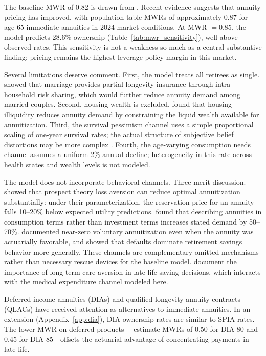 \documentclass[12pt]{article}
\begin{document}
The baseline MWR of 0.82 is drawn from \citet{mitchell1999}. Recent evidence suggests that annuity pricing has improved, with population-table MWRs of approximately 0.87 for age-65 immediate annuities in 2024 market conditions. At MWR $= 0.85$, the model predicts 28.6\% ownership (Table~\ref{tab:mwr_sensitivity}), well above observed rates. This sensitivity is not a weakness so much as a central substantive finding: pricing remains the highest-leverage policy margin in this market.

Several limitations deserve comment. First, the model treats all retirees as single. \citet{kotlikoffspivak1981} showed that marriage provides partial longevity insurance through intra-household risk sharing, which would further reduce annuity demand among married couples. Second, housing wealth is excluded. \citet{pashchenko2013} found that housing illiquidity reduces annuity demand by constraining the liquid wealth available for annuitization. Third, the survival pessimism channel uses a simple proportional scaling of one-year survival rates; the actual structure of subjective belief distortions may be more complex \citep{odeasturrock2023}. Fourth, the age-varying consumption needs channel assumes a uniform 2\% annual decline; heterogeneity in this rate across health states and wealth levels is not modeled.

The model does not incorporate behavioral channels. Three merit discussion. \citet{huscott2007} showed that prospect theory loss aversion can reduce optimal annuitization substantially: under their parameterization, the reservation price for an annuity falls 10--20\% below expected utility predictions. \citet{brown2008framing} found that describing annuities in consumption terms rather than investment terms increases stated demand by 50--70\%. \citet{chalmersreuter2012} documented near-zero voluntary annuitization even when the annuity was actuarially favorable, and \citet{madrian2001} showed that defaults dominate retirement savings behavior more generally. These channels are complementary omitted mechanisms rather than necessary rescue devices for the baseline model. \citet{ameriks2020} document the importance of long-term care aversion in late-life saving decisions, which interacts with the medical expenditure channel modeled here.

Deferred income annuities (DIAs) and qualified longevity annuity contracts (QLACs) have received attention as alternatives to immediate annuities. In an extension (Appendix~\ref{app:dia}), DIA ownership rates are similar to SPIA rates. The lower MWR on deferred products---\citet{wettstein2021} estimate MWRs of 0.50 for DIA-80 and 0.45 for DIA-85---offsets the actuarial advantage of concentrating payments in late life.
\end{document}
